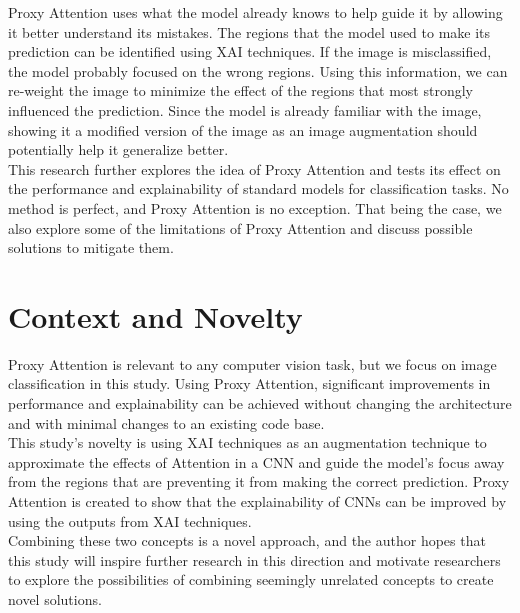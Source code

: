 \documentclass[a4paper,11pt,openright]{book}
\begin{document}
Proxy Attention uses what the model already knows to help guide it by allowing it better understand its mistakes. The regions that the model used to make its prediction can be identified using XAI techniques. If the image is misclassified, the model probably focused on the wrong regions. Using this information, we can re-weight the image to minimize the effect of the regions that most strongly influenced the prediction. Since the model is already familiar with the image, showing it a modified version of the image as an image augmentation should potentially help it generalize better.\\
This research further explores the idea of Proxy Attention and tests its effect on the performance and explainability of standard models for classification tasks. No method is perfect, and Proxy Attention is no exception. That being the case, we also explore some of the limitations of Proxy Attention and discuss possible solutions to mitigate them.

\section{Context and Novelty}
Proxy Attention is relevant to any computer vision task, but we focus on image classification in this study. Using Proxy Attention, significant improvements in performance and explainability can be achieved without changing the architecture and with minimal changes to an existing code base.\\
This study's novelty is using XAI techniques as an augmentation technique to approximate the effects of Attention in a CNN and guide the model's focus away from the regions that are preventing it from making the correct prediction. Proxy Attention is created to show that the explainability of CNNs can be improved by using the outputs from XAI techniques.\\
Combining these two concepts is a novel approach, and the author hopes that this study will inspire further research in this direction and motivate researchers to explore the possibilities of combining seemingly unrelated concepts to create novel solutions.
\end{document}
